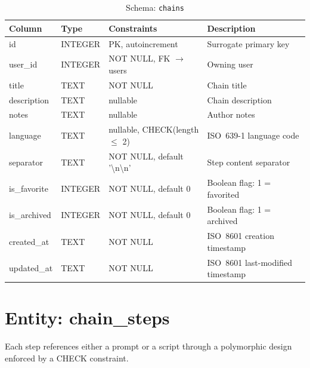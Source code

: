 \documentclass[a4paper, 11pt, oneside]{report}
\begin{document}
\begin{table}[H]
  \centering
  \caption{Schema: \texttt{chains}}
  \label{tab:schema-chains}
  \begin{tabularx}{\textwidth}{l l l X}
    \toprule
    \textbf{Column} & \textbf{Type} & \textbf{Constraints} & \textbf{Description} \\
    \midrule
    id          & INTEGER & PK, autoincrement        & Surrogate primary key \\
    user\_id    & INTEGER & NOT NULL, FK $\to$ users  & Owning user \\
    title       & TEXT    & NOT NULL                  & Chain title \\
    description & TEXT    & nullable                  & Chain description \\
    notes       & TEXT    & nullable                  & Author notes \\
    language    & TEXT    & nullable, CHECK(length $\leq$ 2) & ISO~639-1 language code \\
    separator   & TEXT    & NOT NULL, default '\textbackslash n\textbackslash n' & Step content separator \\
    is\_favorite& INTEGER & NOT NULL, default 0       & Boolean flag: 1 = favorited \\
    is\_archived& INTEGER & NOT NULL, default 0       & Boolean flag: 1 = archived \\
    created\_at & TEXT    & NOT NULL                  & ISO~8601 creation timestamp \\
    updated\_at & TEXT    & NOT NULL                  & ISO~8601 last-modified timestamp \\
    \bottomrule
  \end{tabularx}
\end{table}

\section{Entity: chain\_steps}
\label{sec:entity-chain-steps}

Each step references either a prompt or a script through a polymorphic
design enforced by a CHECK constraint.
\end{document}
